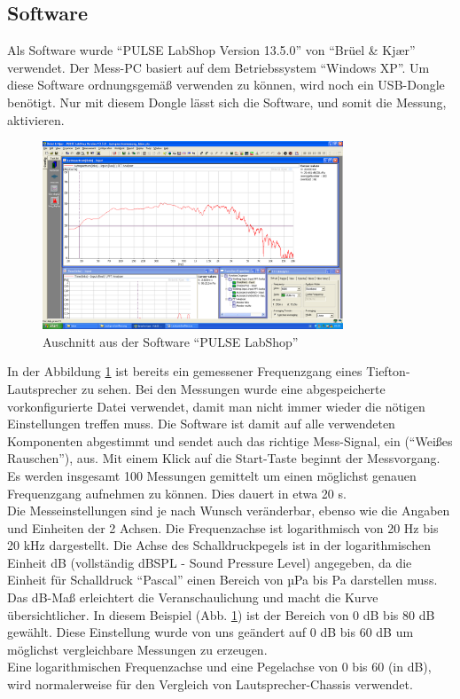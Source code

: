 \subsection*{Software}\label{subsec:4.1.1}
Als Software wurde \enquote{PULSE LabShop Version 13.5.0} von \enquote{Brüel \& Kj\ae r} verwendet.
Der Mess-PC basiert auf dem Betriebssystem \enquote{Windows XP}.
Um diese Software ordnungsgemäß verwenden zu können, wird noch ein USB-Dongle benötigt.
Nur mit diesem Dongle lässt sich die Software, und somit die Messung, aktivieren.
\begin{figure} [H]
	\centering
	\includegraphics[width=0.8\textwidth]{img/LSMessung/VisatonMitSilikonMitWolle.png}
	\caption{Auschnitt aus der Software \enquote{PULSE LabShop}}
	\label{fig:4.1.1.1}
\end{figure}
In der Abbildung \ref{fig:4.1.1.1} ist bereits ein gemessener Frequenzgang eines Tiefton-Lautsprecher zu sehen.
Bei den Messungen wurde eine abgespeicherte vorkonfigurierte Datei verwendet, damit man nicht immer wieder die nötigen Einstellungen treffen muss.
Die Software ist damit auf alle verwendeten Komponenten abgestimmt und sendet auch das richtige Mess-Signal, ein (\enquote{Weißes Rauschen}), aus.
Mit einem Klick auf die Start-Taste beginnt der Messvorgang.
Es werden insgesamt 100 Messungen gemittelt um einen möglichst genauen Frequenzgang aufnehmen zu können.
Dies dauert in etwa 20 s.
\\
Die Messeinstellungen sind je nach Wunsch veränderbar, ebenso wie die Angaben und Einheiten der 2 Achsen.
Die Frequenzachse ist logarithmisch von 20 Hz bis 20 kHz dargestellt.
Die Achse des Schalldruckpegels ist in der logarithmischen Einheit dB (vollständig dBSPL - Sound Pressure Level) angegeben, da die Einheit für Schalldruck \enquote{Pascal} einen Bereich von µPa bis Pa darstellen muss.
Das dB-Maß erleichtert die Veranschaulichung und macht die Kurve übersichtlicher.
In diesem Beispiel (Abb. \ref{fig:4.1.1.1}) ist der Bereich von 0 dB bis 80 dB gewählt.
Diese Einstellung wurde von uns geändert auf 0 dB bis 60 dB um möglichst vergleichbare Messungen zu erzeugen.\\
Eine logarithmischen Frequenzachse und eine Pegelachse von 0 bis 60 (in dB), wird normalerweise für den Vergleich von Lautsprecher-Chassis verwendet.

